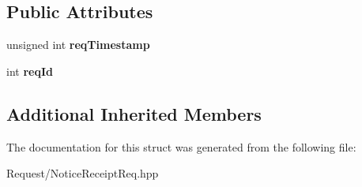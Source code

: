 \subsection*{Public Attributes}
\begin{DoxyCompactItemize}
\item 
\mbox{\label{structts_1_1common_1_1_notice_receipt_req_acd41c25edaeaac9666e94002dfe9fbd9}} 
unsigned int {\bfseries req\+Timestamp}
\item 
\mbox{\label{structts_1_1common_1_1_notice_receipt_req_a0c8466461bb115c2f0c336be4956e0e3}} 
int {\bfseries req\+Id}
\end{DoxyCompactItemize}
\subsection*{Additional Inherited Members}


The documentation for this struct was generated from the following file\+:\begin{DoxyCompactItemize}
\item 
Request/Notice\+Receipt\+Req.\+hpp\end{DoxyCompactItemize}
